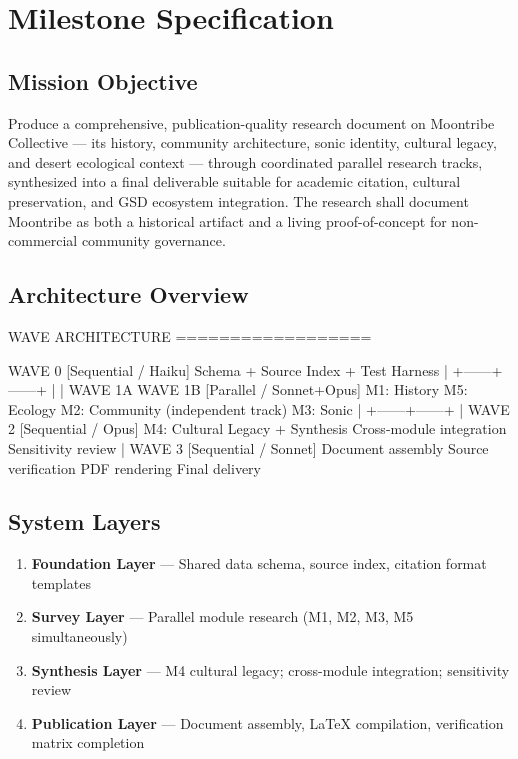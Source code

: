 \documentclass[11pt,letterpaper]{article}
\newcommand{\stageheader}[2]{%
  \noindent\colorbox{#2}{\makebox[\textwidth][l]{%
    \textcolor{white}{\bfseries\sffamily\hspace{6pt}#1\hspace{6pt}}}}%
  \vspace{0.5em}\par%
}
\begin{document}
\newpage
\stageheader{STAGE 3 --- MISSION PACKAGE}{tertiary}

\section{Milestone Specification}

\subsection{Mission Objective}

Produce a comprehensive, publication-quality research document on Moontribe Collective --- its history, community architecture, sonic identity, cultural legacy, and desert ecological context --- through coordinated parallel research tracks, synthesized into a final deliverable suitable for academic citation, cultural preservation, and GSD ecosystem integration. The research shall document Moontribe as both a historical artifact and a living proof-of-concept for non-commercial community governance.

\subsection{Architecture Overview}

\begin{asciibox}
WAVE ARCHITECTURE
==================

WAVE 0 [Sequential / Haiku]
  Schema + Source Index + Test Harness
         |
  +------+------+
  |             |
WAVE 1A        WAVE 1B          [Parallel / Sonnet+Opus]
M1: History    M5: Ecology
M2: Community  (independent track)
M3: Sonic
         |
  +------+------+
         |
WAVE 2 [Sequential / Opus]
  M4: Cultural Legacy + Synthesis
  Cross-module integration
  Sensitivity review
         |
WAVE 3 [Sequential / Sonnet]
  Document assembly
  Source verification
  PDF rendering
  Final delivery
\end{asciibox}

\subsection{System Layers}

\begin{enumerate}
  \item \textbf{Foundation Layer} --- Shared data schema, source index, citation format templates
  \item \textbf{Survey Layer} --- Parallel module research (M1, M2, M3, M5 simultaneously)
  \item \textbf{Synthesis Layer} --- M4 cultural legacy; cross-module integration; sensitivity review
  \item \textbf{Publication Layer} --- Document assembly, LaTeX compilation, verification matrix completion
\end{enumerate}
\end{document}
